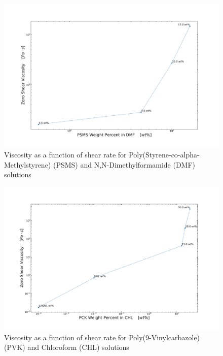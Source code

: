 \begin{figure}[!th]
\centering
\includegraphics[width=\textwidth]{./Figures/c_vs_v_PSMSinDMF.png}
\decoRule
\caption[Viscosity as a function of shear rate for Poly(Styrene-co-alpha-Methylstyrene) (PSMS) and N,N-Dimethylformamide (DMF) solutions]{Viscosity as a function of shear rate for Poly(Styrene-co-alpha-Methylstyrene) (PSMS) and N,N-Dimethylformamide (DMF) solutions}
\label{fig:c_vs_v_PSMSinDMF}
\end{figure}

\begin{figure}[!th]
\centering
\includegraphics[width=\textwidth]{./Figures/c_vs_v_PCKinCHL.png}
\decoRule
\caption[Viscosity as a function of shear rate for Poly(9-Vinylcarbazole) (PVK) and Chloroform (CHL) solutions]{Viscosity as a function of shear rate for Poly(9-Vinylcarbazole) (PVK) and Chloroform (CHL) solutions}
\label{fig:c_vs_v_PCKinCHL}
\end{figure}

